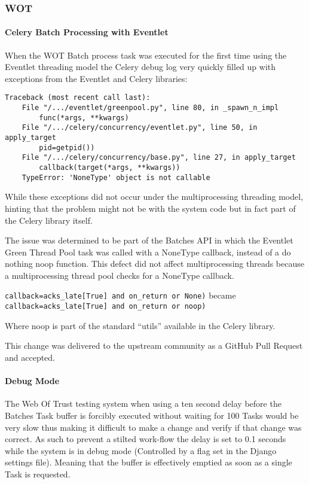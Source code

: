 \subsubsection{WOT}
\paragraph{Celery Batch Processing with Eventlet}
When the WOT Batch process task was executed for the first time using the Eventlet threading model the Celery debug log very quickly filled up with exceptions from the Eventlet and Celery libraries:

\begin{verbatim}
Traceback (most recent call last):
    File "/.../eventlet/greenpool.py", line 80, in _spawn_n_impl
        func(*args, **kwargs)
    File "/.../celery/concurrency/eventlet.py", line 50, in apply_target
        pid=getpid())
    File "/.../celery/concurrency/base.py", line 27, in apply_target
        callback(target(*args, **kwargs))
    TypeError: 'NoneType' object is not callable
\end{verbatim}

While these exceptions did not occur under the multiprocessing threading model, hinting that the problem might not be with the system code but in fact part of the Celery library itself.

The issue was determined to be part of the Batches API in which the Eventlet Green Thread Pool task was called with a NoneType callback, instead of a do nothing noop function.  This defect did not affect multiprocessing threads because a multiprocessing thread pool checks for a NoneType callback.

\verb`callback=acks_late[True] and on_return or None)`
became
\verb`callback=acks_late[True] and on_return or noop)`

Where noop is part of the standard ``utils'' available in the Celery library.

This change was delivered to the upstream community as a GitHub Pull Request and accepted\cite{celery-batches-fix}.

\paragraph{Debug Mode}
The Web Of Trust testing system when using a ten second delay before the Batches Task buffer is forcibly executed without waiting for 100 Tasks would be very slow thus making it difficult to make a change and verify if that change was correct. As such to prevent a stilted work-flow the delay is set to 0.1 seconds while the system is in debug mode (Controlled by a flag set in the Django settings file).  Meaning that the buffer is effectively emptied as soon as a single Task is requested.
